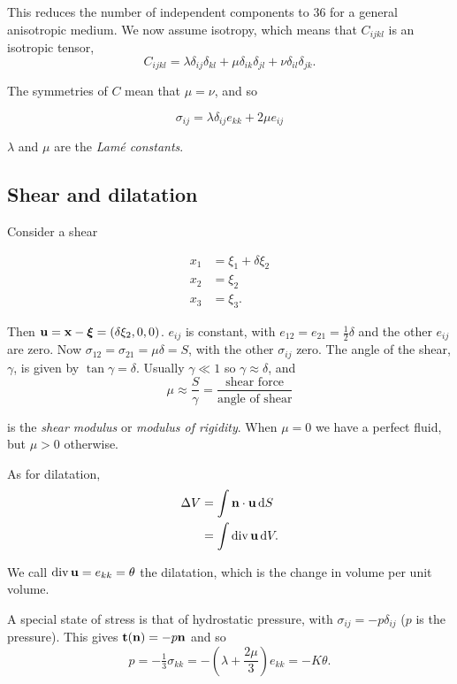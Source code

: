 \documentclass{notes}
\newcommand{\bs}[1]{\boldsymbol{#1}}
\DeclareMathOperator{\dive}{div}
\begin{document}
This reduces the number of independent components to 36 for a general
anisotropic medium.  We now assume isotropy, which means that
$C_{ijkl}$ is an isotropic tensor,
\[
C_{ijkl} = \lambda \delta_{ij} \delta_{kl}
+ \mu \delta_{ik} \delta_{jl}
+ \nu \delta_{il} \delta_{jk}.
\]

The symmetries of $C$ mean that $\mu = \nu$, and so

\begin{equation}\label{eq:solid:constit}
\sigma_{ij} = \lambda \delta_{ij} e_{kk} + 2 \mu e_{ij}
\end{equation}

$\lambda$ and $\mu$ are the \emph{Lam\'e constants}.

\subsection{Shear and dilatation}

Consider a shear

\vspace{1.5in}

\begin{align*}
x_1 &= \xi_1 + \delta \xi_2 \\
x_2 &= \xi_2 \\
x_3 &= \xi_3.
\end{align*}

Then $\vu = \vx - \bs \xi = (\delta \xi_2,0,0)$.  $e_{ij}$ is constant,
with $e_{12} = e_{21} = \tfrac{1}{2} \delta$ and the other $e_{ij}$ are
zero.  Now $\sigma_{12} = \sigma_{21} = \mu \delta = S$, with
the other $\sigma_{ij}$ zero.  The angle of the shear, $\gamma$, is
given by $\tan \gamma = \delta$.  Usually $\gamma \ll 1$ so
$\gamma \approx \delta$, and
\[
\mu \approx \frac{S}{\gamma} = \frac{\text{shear force}}{\text{angle of shear}}
\]

is the \emph{shear modulus} or \emph{modulus of rigidity}.  When $\mu = 0$
we have a perfect fluid, but $\mu > 0$ otherwise.

As for dilatation,
\begin{align*}
\Delta V &= \int \vn \cdot \vu\, \ud S \\
&= \int \dive \vu\, \ud V.
\end{align*}

We call $\dive \vu = e_{kk} = \theta$ the dilatation, which is the
change in volume per unit volume.

A special state of stress is that of hydrostatic pressure, with
$\sigma_{ij} = - p \delta_{ij}$ ($p$ is the pressure).  This gives
$\mathbf{t}(\mathbf{n}) = - p \mathbf{n}$ and so
\[
p = - \tfrac{1}{3}\sigma_{kk} = - \left( \lambda + \frac{2 \mu}{3} \right)
e_{kk} = -K \theta.
\]
\end{document}
